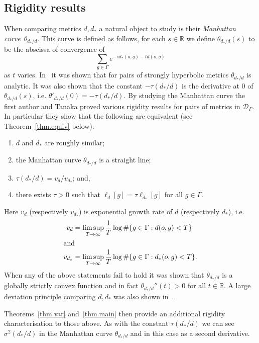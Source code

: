 \documentclass[AHL,Unicode,longabstracts,published]{cedram}
\newcommand{\G}{\Gamma}
\newcommand{\Dc}{\mathcal{D}}
\newcommand{\R}{\mathbb{R}}
\let\originalleft\left
\let\originalright\right
\renewcommand{\left}{\mathopen{}\mathclose\bgroup\originalleft}
\renewcommand{\right}{\aftergroup\egroup\originalright}
\renewcommand*{\to}{\mathchoice{\longrightarrow}{\rightarrow}{\rightarrow}{\rightarrow}}
\newcounter{setofcase}
\newcounter{case}[setofcase]
\theoremstyle{plain}
\newcommand{\G}{\Gamma}
\begin{document}
\subsection{Rigidity results}\label{sec.rigid}
When comparing metrics $d,d_\ast$ a natural object to study is their \emph{Manhattan curve}~$\theta_{d_\ast/d}$. This curve is defined as follows, for each $s \in \R$ we define $\theta_{d_\ast/d}(s)$ to be the abscissa of convergence of
\[
\sum_{g\in\G} e^{-sd_\ast(o,g) - td(o,g)}
\]
as $t$ varies. In~\cite{cantrell.tanaka.2} it was shown that for pairs of strongly hyperbolic metrics $\theta_{d_\ast/d}$ is analytic. It was also shown that the constant $- \tau(d_\ast/d)$ is the derivative at $0$ of $\theta_{d_\ast/d}(s)$, i.e. $\theta'_{d_\ast/d}(0) = - \tau(d_\ast/d)$. By studying the {Manhattan curve} the first author and Tanaka proved various rigidity results for pairs of metrics in $\Dc_\G$. In particular they show that the following are equivalent (see Theorem~\ref{thm.equiv} below):
\begin{enumerate}
\item $d$ and $d_\ast$ are roughly similar;
\item the {Manhattan curve} $\theta_{d_\ast/d}$ is a straight line;
\item $\tau(d_\ast/d) = v_d/v_{d_\ast}$; and,
\item there exists $\tau > 0$ such that $\ell_d[g] = \tau \ell_{d_\ast}[g]$ for all $g\in \G$.
\end{enumerate}
Here $v_d$ (respectively $v_{d_\ast}$) is exponential growth rate of $d$ (respectively $d_\ast$), i.e.
\begin{align*}
v_d &= \limsup_{T\to\infty} \frac{1}{T} \log \#\left\{ g \in \G: d(o,g) < T\right\} \\
\intertext{and} 
v_{d_\ast} &= \limsup_{T\to\infty} \frac{1}{T} \log \#\left\{ g \in \G: d_\ast(o,g) < T\right\}.
\end{align*}
When any of the above statements fail to hold it was shown that $\theta_{d_\ast/d}$ is a globally strictly convex function and in fact $\theta_{d_\ast/d}'' (t) > 0$ for all $t \in \R$. A large deviation principle comparing $d,d_\ast$ was also shown in~\cite{cantrell.tanaka.1}.

Theorems~\ref{thm.var} and~\ref{thm.main} then provide an additional rigidity characterisation to those above. As with the constant $\tau(d_\ast/d)$ we can see $\sigma^2(d_\ast/d)$ in the Manhattan curve $\theta_{d_\ast/d}$ and in this case as a second derivative.
\end{document}
